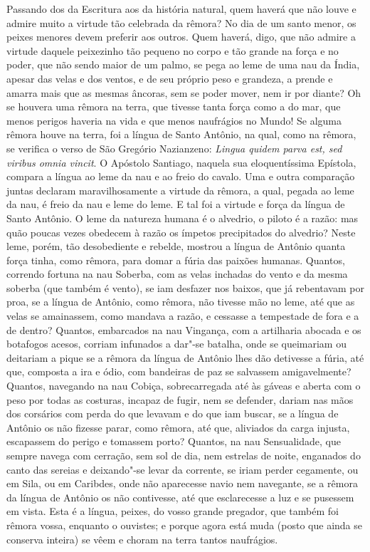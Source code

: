 Passando dos da Escritura aos da história natural, quem haverá que não
louve e admire muito a virtude tão celebrada da rêmora? No dia de um
santo menor, os peixes menores devem preferir aos outros. Quem haverá,
digo, que não admire a virtude daquele peixezinho tão pequeno no corpo e
tão grande na força e no poder, que não sendo maior de um palmo, se pega
ao leme de uma nau da Índia, apesar das velas e dos ventos, e de seu
próprio peso e grandeza, a prende e amarra mais que as mesmas âncoras,
sem se poder mover, nem ir por diante? Oh se houvera uma rêmora na
terra, que tivesse tanta força como a do mar, que menos perigos haveria
na vida e que menos naufrágios no Mundo!
Se alguma rêmora houve na terra, foi a língua de Santo Antônio, na qual,
como na rêmora, se verifica o verso de São Gregório Nazianzeno:
\emph{Lingua quidem parva est, sed viribus omnia vincit}. O Apóstolo
Santiago, naquela sua eloquentíssima Epístola, compara a língua ao leme
da nau e ao freio do cavalo. Uma e outra comparação juntas declaram
maravilhosamente a virtude da rêmora, a qual, pegada ao leme da nau, é
freio da nau e leme do leme. E tal foi a virtude e força da língua de
Santo Antônio. O leme da natureza humana é o alvedrio, o piloto é a
razão: mas quão poucas vezes obedecem à razão os ímpetos precipitados do
alvedrio? Neste leme, porém, tão desobediente e rebelde, mostrou a
língua de Antônio quanta força tinha, como rêmora, para domar a fúria
das paixões humanas. Quantos, correndo fortuna na nau Soberba, com as
velas inchadas do vento e da mesma soberba (que também é vento), se iam
desfazer nos baixos, que já rebentavam por proa, se a língua de Antônio,
como rêmora, não tivesse mão no leme, até que as velas se amainassem,
como mandava a razão, e cessasse a tempestade de fora e a de dentro?
Quantos, embarcados na nau Vingança, com a artilharia abocada e os
botafogos acesos, corriam infunados a dar"-se batalha, onde se queimariam
ou deitariam a pique se a rêmora da língua de Antônio lhes dão detivesse
a fúria, até que, composta a ira e ódio, com bandeiras de paz se
salvassem amigavelmente? Quantos, navegando na nau Cobiça,
sobrecarregada até às gáveas e aberta com o peso por todas as costuras,
incapaz de fugir, nem se defender, dariam nas mãos dos corsários com
perda do que levavam e do que iam buscar, se a língua de Antônio os não
fizesse parar, como rêmora, até que, aliviados da carga injusta,
escapassem do perigo e tomassem porto? Quantos, na nau Sensualidade, que
sempre navega com cerração, sem sol de dia, nem estrelas de noite,
enganados do canto das sereias e deixando"-se levar da corrente, se iriam
perder cegamente, ou em Sila, ou em Caribdes, onde não aparecesse navio
nem navegante, se a rêmora da língua de Antônio os não contivesse, até
que esclarecesse a luz e se pusessem em vista.
Esta é a língua, peixes, do vosso grande pregador, que também foi rêmora
vossa, enquanto o ouvistes; e porque agora está muda (posto que ainda se
conserva inteira) se vêem e choram na terra tantos naufrágios.

